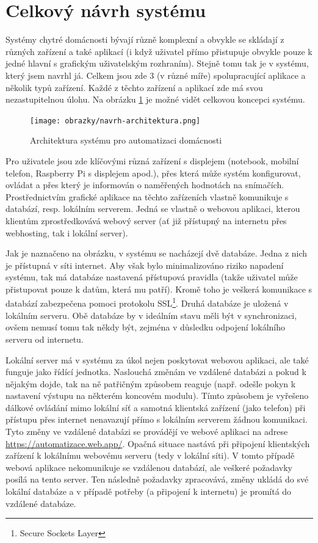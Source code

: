 \section{Celkový návrh systému}
\label{navrh-systemu}
Systémy chytré domácnosti bývají různě komplexní a obvykle se skládají z různých zařízení a také aplikací (i když uživatel přímo přistupuje obvykle pouze k jedné hlavní s grafickým uživatelským rozhraním). Stejně tomu tak je v systému, který jsem navrhl já. Celkem jsou zde 3 (v různé míře) spolupracující aplikace a několik typů zařízení. Každé z těchto zařízení a aplikací zde má svou nezastupitelnou úlohu. Na obrázku \ref{architektura} je možné vidět celkovou koncepci systému. 

\begin{figure}[!hbt]
	\centering
	\texttt{[image: obrazky/navrh-architektura.png]}
	\caption{Architektura systému pro automatizaci domácnosti}
	\label{architektura}
\end{figure}

Pro uživatele jsou zde klíčovými různá zařízení s displejem (notebook, mobilní telefon, Raspberry Pi s displejem apod.), přes která může systém konfigurovat, ovládat a přes který je informován o naměřených hodnotách na snímačích. Prostřednictvím grafické aplikace na těchto zařízeních vlastně komunikuje s databází, resp. lokálním serverem. Jedná se vlastně o webovou aplikaci, kterou klientům zprostředkovává webový server (ať již přístupný na internetu přes webhosting, tak i lokální server). 

Jak je naznačeno na obrázku, v systému se nacházejí dvě databáze. Jedna z nich je přístupná v síti internet. Aby však bylo minimalizováno riziko napadení systému, tak má databáze nastavená přístupová pravidla (takže uživatel může přistupovat pouze k datům, která mu patří). Kromě toho je veškerá komunikace s databází zabezpečena pomoci protokolu SSL\footnote{Secure Sockets Layer}. Druhá databáze je uložená v lokálním serveru. Obě databáze by v ideálním stavu měli být v synchronizaci, ovšem nemusí tomu tak někdy být, zejména v důsledku odpojení lokálního serveru od internetu.

Lokální server má v systému za úkol nejen poskytovat webovou aplikaci, ale také funguje jako řídící jednotka. Naslouchá změnám ve vzdálené databázi a pokud k nějakým dojde, tak na ně patřičným způsobem reaguje (např. odešle pokyn k nastavení výstupu na některém koncovém modulu). Tímto způsobem je vyřešeno dálkové ovládání mimo lokální síť a samotná klientská zařízení (jako telefon) při přístupu přes internet nenavazují přímo s lokálním serverem žádnou komunikaci. Tyto změny ve vzdálené databázi se provádějí ve webové aplikaci na adrese \url{https://automatizace.web.app/}. Opačná situace nastává při připojení klientských zařízení k lokálnímu webovému serveru (tedy v lokální síti). V tomto případě webová aplikace nekomunikuje se vzdálenou databází, ale veškeré požadavky posílá na tento server. Ten následně požadavky zpracovává, změny ukládá do své lokální databáze a v případě potřeby (a připojení k internetu) je promítá do vzdálené databáze.

